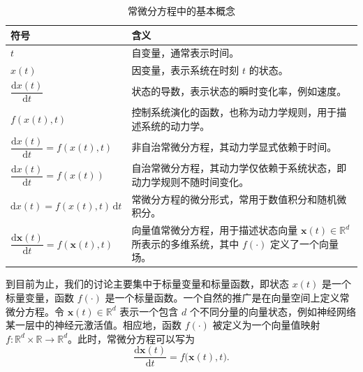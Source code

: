 \documentclass[UTF8,a4paper,zihao=-4,oneside,openany]{ctexbook}
\begin{document}
\begin{table}[htbp]
    \centering
    \renewcommand{\arraystretch}{1.35}
    \setlength{\tabcolsep}{8pt}
    \begin{tabularx}{0.88\textwidth}{
        >{\raggedleft\arraybackslash}p{}
        |
        >{\raggedright\arraybackslash}X
    }
        \toprule
        \textbf{符号} & \textbf{含义} \\
        \midrule

        \(t\)
        &
        自变量，通常表示时间。
        \\

        \(x(t)\)
        &
        因变量，表示系统在时刻 \(t\) 的状态。
        \\

        \(\dfrac{\mathrm{d}x(t)}{\mathrm{d}t}\)
        &
        状态的导数，表示状态的瞬时变化率，例如速度。
        \\

        \(f(x(t),t)\)
        &
        控制系统演化的函数，也称为动力学规则，用于描述系统的动力学。
        \\

        \(\dfrac{\mathrm{d}x(t)}{\mathrm{d}t}
        =f(x(t),t)\)
        &
        非自治常微分方程，其动力学显式依赖于时间。
        \\

        \(\dfrac{\mathrm{d}x(t)}{\mathrm{d}t}
        =f(x(t))\)
        &
        自治常微分方程，其动力学仅依赖于系统状态，即动力学规则不随时间变化。
        \\

        \(\mathrm{d}x(t)
        =f(x(t),t)\,\mathrm{d}t\)
        &
        常微分方程的微分形式，常用于数值积分和随机微积分。
        \\

        \(\dfrac{\mathrm{d}\boldsymbol{x}(t)}{\mathrm{d}t}
        =f(\boldsymbol{x}(t),t)\)
        &
        向量值常微分方程，用于描述状态向量
        \(\boldsymbol{x}(t)\in\mathbb{R}^{d}\)
        所表示的多维系统，其中 \(f(\cdot)\) 定义了一个向量场。
        \\

        \bottomrule
    \end{tabularx}
    \caption{常微分方程中的基本概念}
    \label{tab:basic-ode-concepts}
\end{table}

到目前为止，我们的讨论主要集中于标量变量和标量函数，即状态 \(x(t)\) 是一个标量变量，函数 \(f(\cdot)\) 是一个标量函数。一个自然的推广是在向量空间上定义常微分方程。令 \(\boldsymbol{x}(t)\in\mathbb{R}^{d}\) 表示一个包含 \(d\) 个不同分量的向量状态，例如神经网络某一层中的神经元激活值。相应地，函数 \(f(\cdot)\) 被定义为一个向量值映射 \(f:\mathbb{R}^{d}\times\mathbb{R}\rightarrow\mathbb{R}^{d}\)。此时，常微分方程可以写为
\begin{equation}
\frac{\mathrm{d}\boldsymbol{x}(t)}{\mathrm{d}t}
=
f\bigl(\boldsymbol{x}(t),t\bigr).
\label{eq:vector-valued-ode}
\end{equation}
\end{document}
